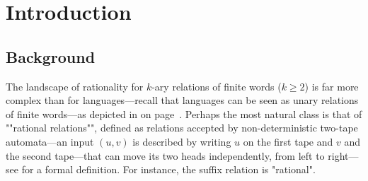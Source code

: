 \section{Introduction}
\label{sec:intro}

\subsection{Background}


The landscape of rationality for $k$-ary relations of finite words ($k \geq 2$) is far more complex than for languages---recall that languages can be seen as unary relations of finite words---as depicted in  on page~\pageref{fig:landscape-rationality}. Perhaps the most natural class is that of \AP""rational relations"", defined as relations accepted by non-deterministic two-tape automata---an input $(u,v)$ is described by writing $u$ on the first tape and $v$ and the second tape---that can move its two heads independently, from left to right---see \cite[\S 2.1]{carton_decision_2006} for a formal definition. For instance, the suffix relation is "rational".


